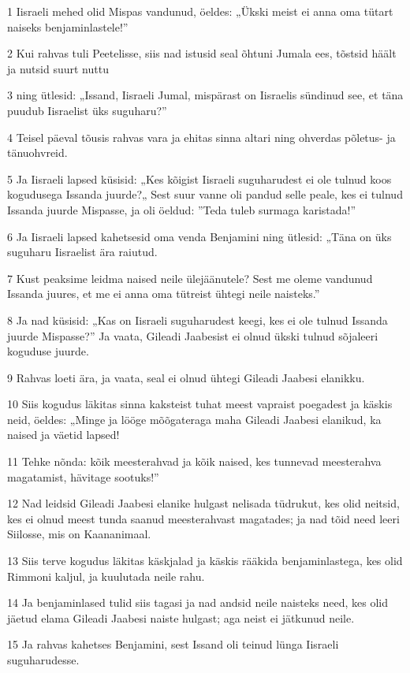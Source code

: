 \par 1 Iisraeli mehed olid Mispas vandunud, öeldes: „Ükski meist ei anna oma tütart naiseks benjaminlastele!”
\par 2 Kui rahvas tuli Peetelisse, siis nad istusid seal õhtuni Jumala ees, tõstsid häält ja nutsid suurt nuttu
\par 3 ning ütlesid: „Issand, Iisraeli Jumal, mispärast on Iisraelis sündinud see, et täna puudub Iisraelist üks suguharu?”
\par 4 Teisel päeval tõusis rahvas vara ja ehitas sinna altari ning ohverdas põletus- ja tänuohvreid.
\par 5 Ja Iisraeli lapsed küsisid: „Kes kõigist Iisraeli suguharudest ei ole tulnud koos kogudusega Issanda juurde?„ Sest suur vanne oli pandud selle peale, kes ei tulnud Issanda juurde Mispasse, ja oli öeldud: ”Teda tuleb surmaga karistada!”
\par 6 Ja Iisraeli lapsed kahetsesid oma venda Benjamini ning ütlesid: „Täna on üks suguharu Iisraelist ära raiutud.
\par 7 Kust peaksime leidma naised neile ülejäänutele? Sest me oleme vandunud Issanda juures, et me ei anna oma tütreist ühtegi neile naisteks.”
\par 8 Ja nad küsisid: „Kas on Iisraeli suguharudest keegi, kes ei ole tulnud Issanda juurde Mispasse?” Ja vaata, Gileadi Jaabesist ei olnud ükski tulnud sõjaleeri koguduse juurde.
\par 9 Rahvas loeti ära, ja vaata, seal ei olnud ühtegi Gileadi Jaabesi elanikku.
\par 10 Siis kogudus läkitas sinna kaksteist tuhat meest vapraist poegadest ja käskis neid, öeldes: „Minge ja lööge mõõgateraga maha Gileadi Jaabesi elanikud, ka naised ja väetid lapsed!
\par 11 Tehke nõnda: kõik meesterahvad ja kõik naised, kes tunnevad meesterahva magatamist, hävitage sootuks!”
\par 12 Nad leidsid Gileadi Jaabesi elanike hulgast nelisada tüdrukut, kes olid neitsid, kes ei olnud meest tunda saanud meesterahvast magatades; ja nad tõid need leeri Siilosse, mis on Kaananimaal.
\par 13 Siis terve kogudus läkitas käskjalad ja käskis rääkida benjaminlastega, kes olid Rimmoni kaljul, ja kuulutada neile rahu.
\par 14 Ja benjaminlased tulid siis tagasi ja nad andsid neile naisteks need, kes olid jäetud elama Gileadi Jaabesi naiste hulgast; aga neist ei jätkunud neile.
\par 15 Ja rahvas kahetses Benjamini, sest Issand oli teinud lünga Iisraeli suguharudesse.
